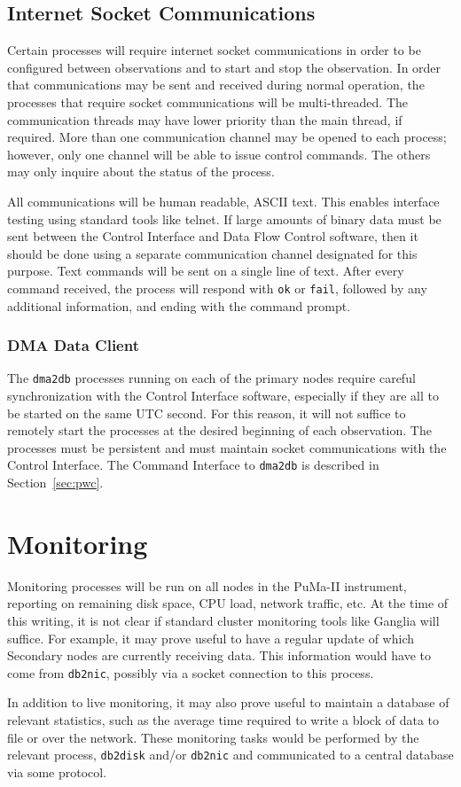 \subsection{Internet Socket Communications}

Certain processes will require internet socket communications in order
to be configured between observations and to start and stop the
observation.  In order that communications may be sent and received
during normal operation, the processes that require socket
communications will be multi-threaded.  The communication threads may
have lower priority than the main thread, if required.  More than one
communication channel may be opened to each process; however, only one
channel will be able to issue control commands.  The others may only
inquire about the status of the process.

All communications will be human readable, ASCII text.  This enables
interface testing using standard tools like telnet.  If large amounts
of binary data must be sent between the Control Interface and Data
Flow Control software, then it should be done using a separate
communication channel designated for this purpose.  Text commands will
be sent on a single line of text.  After every command received, the
process will respond with {\tt ok} or {\tt fail}, followed by any
additional information, and ending with the command prompt.

\subsubsection{DMA Data Client}

The {\tt dma2db} processes running on each of the primary nodes
require careful synchronization with the Control Interface software,
especially if they are all to be started on the same UTC second.  For
this reason, it will not suffice to remotely start the processes at
the desired beginning of each observation.  The processes must be
persistent and must maintain socket communications with the Control
Interface.  The Command Interface to {\tt dma2db} is described in
Section~\ref{sec:pwc}.

\section{Monitoring}

Monitoring processes will be run on all nodes in the PuMa-II
instrument, reporting on remaining disk space, CPU load, network
traffic, etc.  At the time of this writing, it is not clear if
standard cluster monitoring tools like Ganglia will suffice.  For
example, it may prove useful to have a regular update of which
Secondary nodes are currently receiving data.  This information would
have to come from {\tt db2nic}, possibly via a socket connection to
this process.

In addition to live monitoring, it may also prove useful to maintain a
database of relevant statistics, such as the average time required to
write a block of data to file or over the network.  These monitoring
tasks would be performed by the relevant process, {\tt db2disk} and/or
{\tt db2nic} and communicated to a central database via some protocol.
